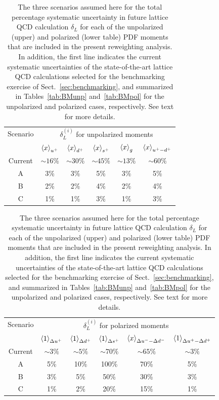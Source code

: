 \begin{table}[t]
  \centering
  \renewcommand{\arraystretch}{1.3} 
  \begin{tabular}{c||ccccc}
    \hline
    Scenario &  \multicolumn{5}{c}{$\delta_L^{(i)}$ for unpolarized moments}   \\
&    $\left\langle x\right\rangle_{u^+}$  &   $\left\langle x\right\rangle_{d^+}$   &  $\left\langle x\right\rangle_{s^+}$  &
$\left\langle x\right\rangle_{g}$  &   $\left\langle x\right\rangle_{u^+-d^+}$  \\
    \hline
    Current  & $\sim 16\%$  &  $\sim 30\%$
    & $\sim 45\%$  & $\sim 13\%$  &  $\sim 60\%$ \\
    A   & 3\%  & 3\% &  5\% &  3\% &  5\% \\
 B   & 2\%  & 2\% &  4\% &  2\% &  4\%  \\
  C   & 1\%  & 1\% &  3\% &  1\% &  3\%  \\
    \hline
  \end{tabular}\vspace{0.7cm}
   \begin{tabular}{c||ccccc}
    \hline
    Scenario   &
    \multicolumn{5}{c}{$\delta_L^{(i)}$ for polarized moments} \\ 
& $\left\langle 1\right\rangle_{\Delta u^+}$  & $\left\langle 1\right\rangle_{\Delta d^+}$  & $\left\langle 1\right\rangle_{\Delta s^+}$
&  $\left\langle x\right\rangle_{\Delta u^--\Delta d^-}$  &  $\left\langle 1\right\rangle_{\Delta u^+ - \Delta d^+}$\\
    \hline
    Current  &
    $\sim 3\%$  & $\sim 5\%$ & $\sim 70\%$ & $\sim 65\%$ & $\sim 3\%$ \\
    \hline
    A   & 
    5\% &    10\%  &   100\% &    70\%  &    5\% \\
 B   &
 3\% &    5\%  &   50\% &    30\%  &    3\% \\
  C   & 1\% &    2\%  &   20\% &    15\%  &    1\% \\
    \hline
  \end{tabular}
   \caption{\small The three scenarios assumed here
     for the total percentage
     systematic uncertainty
    in future lattice QCD calculation $\delta_L$ for each
    of the unpolarized (upper) and polarized (lower table) PDF
    moments that are included
    in the present reweighting analysis.
    In addition, the first line indicates the current systematic
    uncertainties of the state-of-the-art lattice QCD calculations
    selected for the benchmarking exercise of Sect.~\ref{sec:benchmarking},
    and summarized in Tables~\ref{tab:BMunp} and~\ref{tab:BMpol}
    for the unpolarized and polarized cases, respectively.
    See text for more details.
\label{tab:scenarios}
  }
\end{table}

